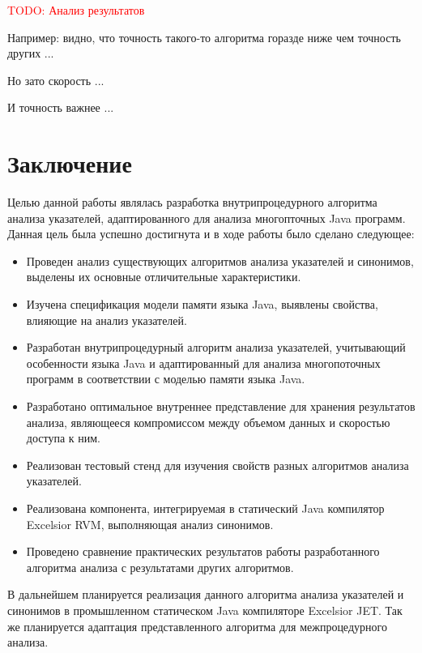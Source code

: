 \documentclass[14pt,titlepage]{extarticle}
\newcommand{\todo}[1]{\textcolor{red}{\eng{TODO}: #1}}
\newcommand{\eng}[1]{{\English#1}}
\let\oldsection\section
\renewcommand{\section}{\newpage\oldsection}
\newcommand{\sectionwithoutnumber}[1]{
  \section*{#1}
  \addcontentsline{toc}{section}{#1}
}
\begin{document}
    \todo{Анализ результатов}

    Например: видно, что точность такого-то алгоритма горазде ниже чем точность
    других ...

    Но зато скорость ...

    И точность важнее ...

  \sectionwithoutnumber{Заключение}

    Целью данной работы являлась разработка внутрипроцедурного алгоритма
    анализа указателей, адаптированного для анализа многопточных Java программ.
    Данная цель была успешно достигнута и в ходе работы было сделано следующее:
    \begin{itemize}
      \item Проведен анализ существующих алгоритмов анализа указателей и
            синонимов, выделены их основные отличительные характеристики.
      \item Изучена спецификация модели памяти языка Java, выявлены свойства,
            влияющие на анализ указателей.
      \item Разработан внутрипроцедурный алгоритм анализа указателей,
            учитывающий особенности языка Java и адаптированный для анализа
            многопоточных программ в соответствии с моделью памяти языка Java.
      \item Разработано оптимальное внутреннее представление для хранения
            результатов анализа, являющееся компромиссом между объемом данных
            и скоростью доступа к ним.
      \item Реализован тестовый стенд для изучения свойств разных алгоритмов
            анализа указателей.
      \item Реализована компонента, интегрируемая в статический Java компилятор
            Excelsior RVM, выполняющая анализ синонимов.
      \item Проведено сравнение практических результатов работы разработанного
            алгоритма анализа с результатами других алгоритмов.
    \end{itemize}

    В дальнейшем планируется реализация данного алгоритма анализа указателей и
    синонимов в промышленном статическом Java компиляторе Excelsior JET.
    Так же планируется адаптация представленного алгоритма для межпроцедурного
    анализа.

  \newpage
    
\end{document}

